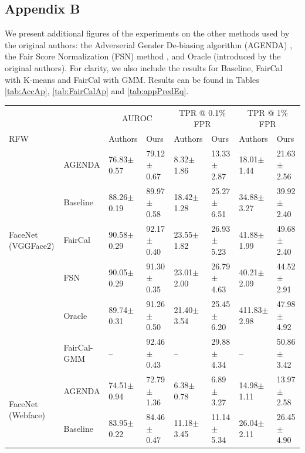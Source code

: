 \newpage 
 
\subsection{Appendix B}
We present additional figures of the experiments on the other methods used by the original authors: the Adverserial Gender De-biasing algorithm (AGENDA) \citep{DBLP:journals/corr/abs-2006-07845}, the Fair Score Normalization (FSN) method \citep{TERHORST2020332}, and Oracle (introduced by the original authors). For clarity, we also include the results for Baseline, FairCal with K-means and FairCal with GMM. Results can be found in Tables \ref{tab:AccAp}, \ref{tab:FairCalAp} and \ref{tab:appPredEq}.

\begin{table}
\footnotesize
\centering
\begin{tabular}{l l ll ll ll}
\toprule
&& \multicolumn{2}{c}{AUROC} & \multicolumn{2}{c}{TPR @ 0.1\% FPR} & \multicolumn{2}{c}{TPR @ 1\% FPR} \\
RFW & &  Authors  &   Ours   & Authors &  Ours   & Authors & Ours \\
\midrule
\multirow{5}{5em}{FaceNet (VGGFace2)} 
& AGENDA      &  76.83$\pm$0.57 &  79.12$\pm$0.67 &    8.32$\pm$1.86 &  13.33$\pm$2.87 &   18.01$\pm$1.44 &  21.63$\pm$2.56 \\
& Baseline    &  88.26$\pm$0.19 &  89.97$\pm$0.58 &   18.42$\pm$1.28 &  25.27$\pm$6.51 &   34.88$\pm$3.27 &  39.92$\pm$2.40 \\
& FairCal     &  90.58$\pm$0.29 &  92.17$\pm$0.40 &   23.55$\pm$1.82 &  26.93$\pm$5.23 &   41.88$\pm$1.99 &  49.68$\pm$2.40 \\
& FSN         &  90.05$\pm$0.29 &  91.30$\pm$0.35 &   23.01$\pm$2.00 &  26.79$\pm$4.63 &   40.21$\pm$2.09 &  44.52$\pm$2.91 \\
& Oracle      &  89.74$\pm$0.31 &  91.26$\pm$0.50 &   21.40$\pm$3.54 &  25.45$\pm$6.20 &  411.83$\pm$2.98 &  47.98$\pm$4.92 \\
& FairCal-GMM &           -- &  92.46$\pm$0.43 &            -- &  29.88$\pm$4.34 &           -- &  50.86$\pm$3.42 \\
\hline
\multirow{5}{5em}{FaceNet (Webface)} 
& AGENDA      &  74.51$\pm$0.94 &  72.79$\pm$1.36 &    6.38$\pm$0.78 &   6.89$\pm$3.27 &  14.98$\pm$1.11 &  13.97$\pm$2.58 \\
& Baseline    &  83.95$\pm$0.22 &  84.46$\pm$0.47 &   11.18$\pm$3.45 &  11.14$\pm$5.34 &  26.04$\pm$2.11 &  26.45$\pm$4.90 \\

\end{tabular}
\end{table}
